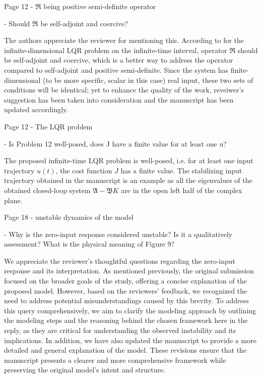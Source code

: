 \documentclass[12pt,answers]{exam}
\begin{document}
\begin{questions}
    \question Page 12 - $\mathfrak{R}$ being positive semi-definite operator

    - Should $\mathfrak{R}$ be self-adjoint and coercive?

    \begin{solutionorbox} \label{comment:1_9}
        The authors appreciate the reviewer for mentioning this. According to \cite{curtainbook} for the infinite-dimensional LQR problem on the infinite-time interval, operator $\mathfrak{R}$ should be self-adjoint and coercive, which is a better way to address the operator compared to self-adjoint and positive semi-definite. Since the system has finite-dimensional (to be more specific, scalar in this case) real input, these two sets of conditions will be identical; yet to enhance the quality of the work, reveiwer's suggestion has been taken into consideration and the manuscript has been updated accordingly.
    \end{solutionorbox}


    \question Page 12 - The LQR problem

    - Is Problem 12 well-posed, does J have a finite value for at least one u?

    \begin{solutionorbox} \label{comment:1_10}
        The proposed infinite-time LQR problem is well-posed, i.e. for at least one input trajectory $u(t)$, the cost function $J$ has a finite value. The stabilizing input trajectory obtained in the manuscript is an example as all the eigenvalues of the obtained closed-loop system $\mathfrak{A} - \mathfrak{B} K$ are in the open left half of the complex plane. 
    \end{solutionorbox}


    \question Page 18 - unstable dynamics of the model

    - Why is the zero-input response considered unstable? Is it a qualitatively assessment? What is the physical meaning of Figure 9?

    \begin{solutionorbox} \label{comment:1_11}
        We appreciate the reviewer’s thoughtful questions regarding the zero-input response and its interpretation. As mentioned previously, the original submission focused on the broader goals of the study, offering a concise explanation of the proposed model. However, based on the reviewers’ feedback, we recognized the need to address potential misunderstandings caused by this brevity. To address this query comprehensively, we aim to clarify the modeling approach by outlining the modeling steps and the reasoning behind the chosen framework here in the reply, as they are critical for understanding the observed instability and its implications. In addition, we have also updated the manuscript to provide a more detailed and general explanation of the model. These revisions ensure that the manuscript presents a clearer and more comprehensive framework while preserving the original model’s intent and structure.
        

\end{solutionorbox}
\end{questions}
\end{document}
